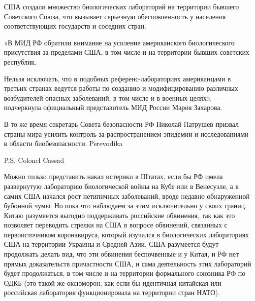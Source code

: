 США создали множество биологических лабораторий на территории бывшего
Советского Союза, что вызывает серьезную обеспокоенность у населения
соответствующих государств и соседних стран.

«В МИД РФ обратили внимание на усиление американского биологического
присутствия за пределами США, в том числе и на территории бывших советских
республик.

Нельзя исключать, что в подобных референс-лабораториях американцами в третьих
странах ведутся работы по созданию и модифицированию различных возбудителей
опасных заболеваний, в том числе и в военных целях», --- подчеркнула официальный
представитель МИД России Мария Захарова.

В то же время секретарь Совета безопасности РФ Николай Патрушев призвал страны
мира усилить контроль за распространением эпидемии и исследованиями в области
биобезопасности.  Perevodika

P.S. Colonel Cassad

Можно только представить накал истерики в Штатах, если бы РФ имела развернутую
лабораторию биологической войны на Кубе или в Венесуэле, а в самих США начался
рост нетипичных заболеваний, вроде недавно обнаруженной бубонной чумы. Но пока
что наблюдаем за этим исключительно у своих границ.  Китаю разумеется выгодно
поддерживать российские обвинения, так как это позволяет переводить стрелки на
США в вопросе обвинений, связанных с первоисточником коронавируса, который
изучался в биологических лабораториях США на территории Украины и Средней Азии.
США разумеется будут продолжать делать вид, что эти обвинения беспочвенные и у
Китая, и РФ нет прямых доказательств причастности США, и сама деятельность этих
лабораторий будет продолжаться, в том числе и на территории формального
союзника РФ по ОДКБ (это такой же оксюморон, как если бы идентичная китайская
или российская лаборатория функционировала на территории стран НАТО).
  
